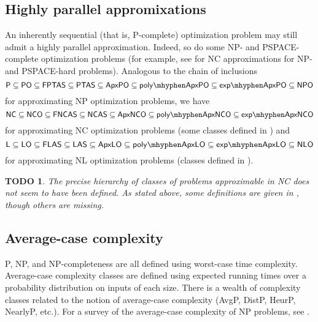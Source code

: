 \documentclass{article}
\newtheorem{todo}{TODO}
\begin{document}
\subsection{Highly parallel appromixations}

An inherently sequential (that is, \textsf{P}-complete) optimization problem may still admit a highly parallel approximation.
Indeed, so do some \textsf{NP}- and \textsf{PSPACE}-complete optimization problems (for example, see \cite{hmrrrs98} for \textsf{NC} approximations for \textsf{NP}- and \textsf{PSPACE}-hard problems).
Analogous to the chain of inclusions
\begin{displaymath}
  \mathsf{P} \subseteq \mathsf{PO} \subseteq \mathsf{FPTAS} \subseteq \mathsf{PTAS} \subseteq \mathsf{ApxPO} \subseteq \mathsf{poly\mhyphen ApxPO} \subseteq \mathsf{exp\mhyphen ApxPO} \subseteq \mathsf{NPO}
\end{displaymath}
for approximating \textsf{NP} optimization problems, we have
\begin{displaymath}
  \mathsf{NC} \subseteq \mathsf{NCO} \subseteq \mathsf{FNCAS} \subseteq \mathsf{NCAS} \subseteq \mathsf{ApxNCO} \subseteq \mathsf{poly\mhyphen ApxNCO} \subseteq \mathsf{exp\mhyphen ApxNCO}
\end{displaymath}
for approximating \textsf{NC} optimization problems (some classes defined in \cite{dsst97}) and
\begin{displaymath}
  \mathsf{L} \subseteq \mathsf{LO} \subseteq \mathsf{FLAS} \subseteq \mathsf{LAS} \subseteq \mathsf{ApxLO} \subseteq \mathsf{poly\mhyphen ApxLO} \subseteq \mathsf{exp\mhyphen ApxLO} \subseteq \mathsf{NLO}
\end{displaymath}
for approximating \textsf{NL} optimization problems (classes defined in \cite{tantau07}).

\begin{todo}
  The precise hierarchy of classes of problems approximable in \textsl{\textsf{NC}}{} does not seem to have been defined.
  As stated above, some definitions are given in \cite{dsst97}, though others are missing.
\end{todo}

\subsection{Average-case complexity}

\textsf{P}, \textsf{NP}, and \textsf{NP}-completeness are all defined using worst-case time complexity.
Average-case complexity classes are defined using expected running times over a probability distribution on inputs of each size.
There is a wealth of complexity classes related to the notion of average-case complexity (\textsf{AvgP}, \textsf{DistP}, \textsf{HeurP}, \textsf{NearlyP}, etc.).
For a survey of the average-case complexity of \textsf{NP} problems, see \cite{bt06}.
\end{document}
